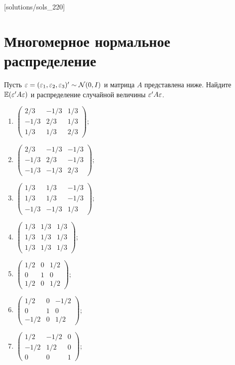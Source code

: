 [solutions/sols_220]

\chapter{Многомерное нормальное распределение} %

\begin{problem}
Пусть $\varepsilon = (\varepsilon_1, \varepsilon_2, \varepsilon_3)'\sim \mathcal{N}(0,I)$ и матрица $A$ представлена ниже. Найдите $\mathbb{E}(\varepsilon'A\varepsilon)$ и распределение случайной величины $\varepsilon'A\varepsilon$.

\begin{enumerate}
\item $\begin{pmatrix} 2/3 & -1/3 & 1/3 \\ -1/3 & 2/3 & 1/3 \\ 1/3 & 1/3 & 2/3 \end{pmatrix}$;
\item $\begin{pmatrix} 2/3 & -1/3 & -1/3 \\ -1/3 & 2/3 & -1/3 \\ -1/3 & -1/3 & 2/3 \end{pmatrix}$;
\item $\begin{pmatrix} 1/3 & 1/3 & -1/3 \\ 1/3 & 1/3 & -1/3 \\ -1/3 & -1/3 & 1/3 \end{pmatrix}$;
\item $\begin{pmatrix} 1/3 & 1/3 & 1/3 \\ 1/3 & 1/3 & 1/3 \\ 1/3 & 1/3 & 1/3 \end{pmatrix}$;
\item $\begin{pmatrix} 1/2 & 0 & 1/2 \\ 0 & 1 & 0 \\ 1/2 & 0 & 1/2 \end{pmatrix}$;
\item $\begin{pmatrix} 1/2 & 0 & -1/2 \\ 0 & 1 & 0 \\ -1/2 & 0 & 1/2 \end{pmatrix}$;
\item $\begin{pmatrix} 1/2 & -1/2 & 0 \\ -1/2 & 1/2 & 0 \\ 0 & 0 & 1 \end{pmatrix}$;

\end{enumerate}
\end{problem}
